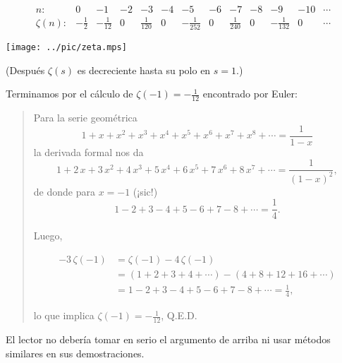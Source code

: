 \documentclass{article}
\begin{document}
\[ \begin{array}{rcccccccccccc}
n\colon & 0 & -1 & -2 & -3 & -4 & -5 & -6 & -7 & -8 & -9 & -10 & \cdots \\
\hline
\zeta(n)\colon & -\frac{1}{2} & -\frac{1}{12} & 0 & \frac{1}{120} & 0 & -\frac{1}{252} & 0 & \frac{1}{240} & 0 & -\frac{1}{132} & 0 & \cdots
\end{array} \]

\begin{center}
\noindent\texttt{[image: ../pic/zeta.mps]}
\end{center}

\noindent (Después $\zeta (s)$ es decreciente hasta su polo en $s = 1$.)

\pagebreak

Terminamos por el cálculo de $\zeta (-1) = -\frac{1}{12}$ encontrado por Euler:

\begin{quote}
Para la serie geométrica
$$1 + x + x^2 + x^3 + x^4 + x^5 + x^6 + x^7 + x^8 + \cdots = \frac{1}{1-x}$$
la derivada formal nos da
$$1 + 2\,x + 3\,x^2 + 4\,x^3 + 5\,x^4 + 6\,x^5 + 7\,x^6 + 8\,x^7 + \cdots = \frac{1}{(1-x)^2},$$
de donde para $x = -1$ (¡sic!)
$$1 - 2 + 3 - 4 + 5 - 6 + 7 - 8 + \cdots = \frac{1}{4}.$$

Luego,

\begin{align*}
-3\,\zeta (-1) & = \zeta (-1) - 4\,\zeta (-1) \\
 & = (1 + 2 + 3 + 4 + \cdots) - (4 + 8 + 12 + 16 + \cdots) \\
  & = 1 - 2 + 3 - 4 + 5 - 6 + 7 - 8 + \cdots = \frac{1}{4},
\end{align*}

\noindent lo que implica $\zeta (-1) = -\frac{1}{12}$, Q.E.D.
\end{quote}

El lector no debería tomar en serio el argumento de arriba ni usar métodos similares en sus demostraciones.
\end{document}
